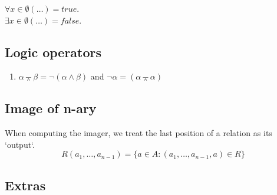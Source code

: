 \documentclass[twocolumn,a4paper]{article}
\newcommand{\image}[1]{
\begin{figure}[ht]
	\centering
	\fbox{\resizebox{1\columnwidth}{!}{\texttt{[image: \#1]}}}
\end{figure}
}
\begin{document}
\(\forall x\in\emptyset(\ldots) = true\). \\
\(\exists x\in\emptyset(\ldots) = false\).

\subsection*{Logic operators}
\begin{enumerate}
	\item $\alpha \barwedge \beta = \neg (\alpha \wedge \beta)$ and $\neg \alpha = (\alpha \barwedge \alpha)$
\end{enumerate}

\subsection*{Image of n-ary}
When computing the imager, we treat the last position of a relation as its `output`. 
\begin{equation}
	R(a_1, \ldots, a_{n-1}) = \{a \in A : (a_1, \ldots, a_{n-1}, a) \in R \}
\end{equation}

\newpage
\subsection*{Extras}

\image{2017_1/2017a/uppg3.png}
\image{2017_1/2017a/uppg5.png}
\image{2017_1/2017a/uppg4-no-crop.png}
\image{2017_1/2017a/4-help.png}
\image{misc/2018-2-2-q.png}
\image{misc/2018-2-2-s.png}
\image{misc/vertecies-uppg.png}
\image{misc/vertecies-sol.png}
\image{misc/languages.png}
\image{misc/5-1.png}
\image{misc/5-2.png}
\end{document}
